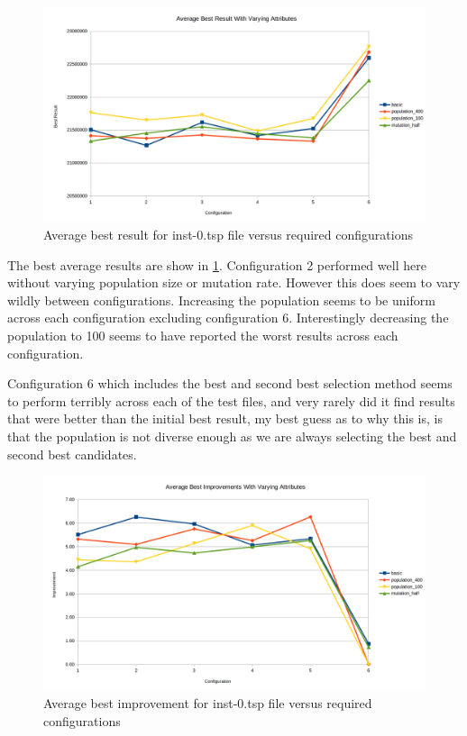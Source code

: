 \begin{figure}[H]
\vspace{-5pt}
\centering
\includegraphics[width=1.0\textwidth]{images/inst-0-average-best.png}
\caption{\label{fig:inst-0-average-best}Average best result for inst-0.tsp file versus required configurations}
\end{figure}

The best average results are show in \ref{fig:inst-0-average-best}. Configuration 2 performed well here without varying population size or mutation rate. However this does seem to vary wildly between configurations. Increasing the population seems to be uniform across each configuration excluding configuration 6. Interestingly decreasing the population to 100 seems to have reported the worst results across each configuration.

Configuration 6 which includes the best and second best selection method seems to perform terribly across each of the test files, and very rarely did it find results that were better than the initial best result, my best guess as to why this is, is that the population is not diverse enough as we are always selecting the best and second best candidates.

\begin{figure}[H]
\vspace{-5pt}
\centering
\includegraphics[width=1.0\textwidth]{images/inst-0-best-improvements.png}
\caption{\label{fig:inst-0-best-improvements}Average best improvement for inst-0.tsp file versus required configurations}
\end{figure}

